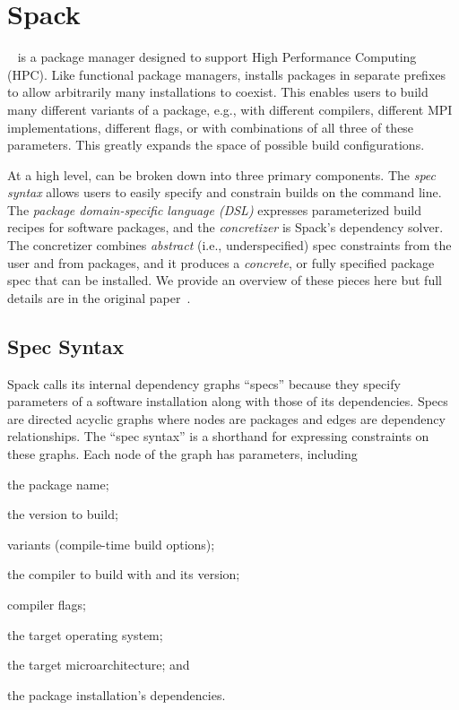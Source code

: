 \section{Spack}
\label{sec:software-model}

\spack~\cite{gamblin+:sc15} is a package manager designed to support High Performance
Computing (HPC). Like functional package managers, \spack installs packages in separate
prefixes to allow arbitrarily many installations to coexist. This enables users to build
many different variants of a package, e.g., with different compilers, different MPI
implementations, different flags, or with combinations of all three of these parameters.
This greatly expands the space of possible build configurations.

At a high level, \spack can be broken down into three primary components. The {\it spec
  syntax} allows users to easily specify and constrain builds on the command line. The
{\it package domain-specific language (DSL)} expresses parameterized build recipes for
software packages, and the {\it concretizer} is Spack's dependency solver. The
concretizer combines {\it abstract} (i.e., underspecified) spec constraints from the
user and from packages, and it produces a {\it concrete}, or fully specified package
spec that can be installed. We provide an overview of these pieces here but full details
are in the original paper~\cite{gamblin+:sc15}.

\subsection{Spec Syntax}
\label{sec:specs}

Spack calls its internal dependency graphs ``specs'' because they specify parameters of
a software installation along with those of its dependencies. Specs are directed acyclic
graphs where nodes are packages and edges are dependency relationships. The ``spec
syntax'' is a shorthand for expressing constraints on these graphs. Each node of the
graph has parameters, including
\begin{enumerate*}
\item the package name;
\item the version to build;
\item variants (compile-time build options);
\item the compiler to build with and its version;
\item compiler flags;
\item the target operating system;
\item the target microarchitecture; and
\item the package installation's dependencies.
\end{enumerate*}

